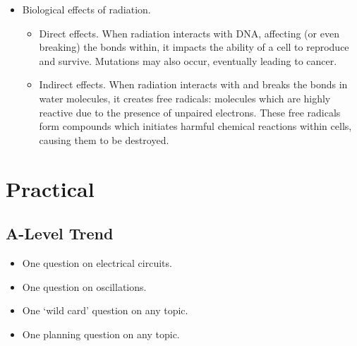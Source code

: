 \documentclass[oneside]{book}
\begin{document}
\begin{itemize}
    \item Biological effects of radiation.
    \begin{itemize}
        \item Direct effects. When radiation interacts with DNA, affecting (or even breaking) the bonds within, it impacts the ability of a cell to reproduce and survive. Mutations may also occur, eventually leading to cancer.
        \item Indirect effects. When radiation interacts with and breaks the bonds in water molecules, it creates free radicals: molecules which are highly reactive due to the presence of unpaired electrons. These free radicals form compounds which initiates harmful chemical reactions within cells, causing them to be destroyed.
    \end{itemize}
\end{itemize}

\chapter{Practical}
\section{A-Level Trend}
\begin{itemize}
    \item One question on electrical circuits.
    \item One question on oscillations.
    \item One `wild card' question on any topic.
    \item One planning question on any topic.
\end{itemize}
\end{document}
